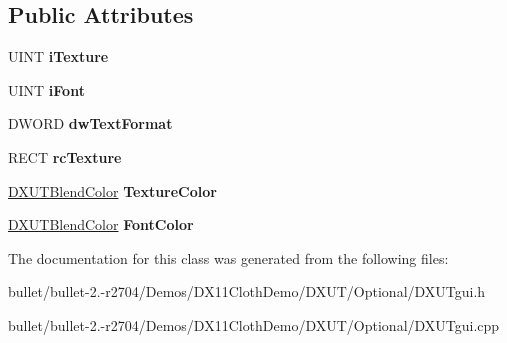 \subsection*{Public Attributes}
\begin{DoxyCompactItemize}
\item 
\hypertarget{class_c_d_x_u_t_element_a1e79d31003ef5a165cdf4a6fe456840b}{U\+I\+N\+T {\bfseries i\+Texture}}\label{class_c_d_x_u_t_element_a1e79d31003ef5a165cdf4a6fe456840b}

\item 
\hypertarget{class_c_d_x_u_t_element_a7f492bcce7116c2fc933a9e7be0b4f1a}{U\+I\+N\+T {\bfseries i\+Font}}\label{class_c_d_x_u_t_element_a7f492bcce7116c2fc933a9e7be0b4f1a}

\item 
\hypertarget{class_c_d_x_u_t_element_a5b22f735f51c0380731339c611ec3a21}{D\+W\+O\+R\+D {\bfseries dw\+Text\+Format}}\label{class_c_d_x_u_t_element_a5b22f735f51c0380731339c611ec3a21}

\item 
\hypertarget{class_c_d_x_u_t_element_a3f74c622496396f35eff3fe9e332014d}{R\+E\+C\+T {\bfseries rc\+Texture}}\label{class_c_d_x_u_t_element_a3f74c622496396f35eff3fe9e332014d}

\item 
\hypertarget{class_c_d_x_u_t_element_a52129b00dee0564016627a7a22a41f02}{\hyperlink{struct_d_x_u_t_blend_color}{D\+X\+U\+T\+Blend\+Color} {\bfseries Texture\+Color}}\label{class_c_d_x_u_t_element_a52129b00dee0564016627a7a22a41f02}

\item 
\hypertarget{class_c_d_x_u_t_element_ac853da0ce0830e80e5ec969c89762079}{\hyperlink{struct_d_x_u_t_blend_color}{D\+X\+U\+T\+Blend\+Color} {\bfseries Font\+Color}}\label{class_c_d_x_u_t_element_ac853da0ce0830e80e5ec969c89762079}

\end{DoxyCompactItemize}


The documentation for this class was generated from the following files\+:\begin{DoxyCompactItemize}
\item 
bullet/bullet-\/2.-\/r2704/\+Demos/\+D\+X11\+Cloth\+Demo/\+D\+X\+U\+T/\+Optional/D\+X\+U\+Tgui.\+h\item 
bullet/bullet-\/2.-\/r2704/\+Demos/\+D\+X11\+Cloth\+Demo/\+D\+X\+U\+T/\+Optional/D\+X\+U\+Tgui.\+cpp\end{DoxyCompactItemize}
